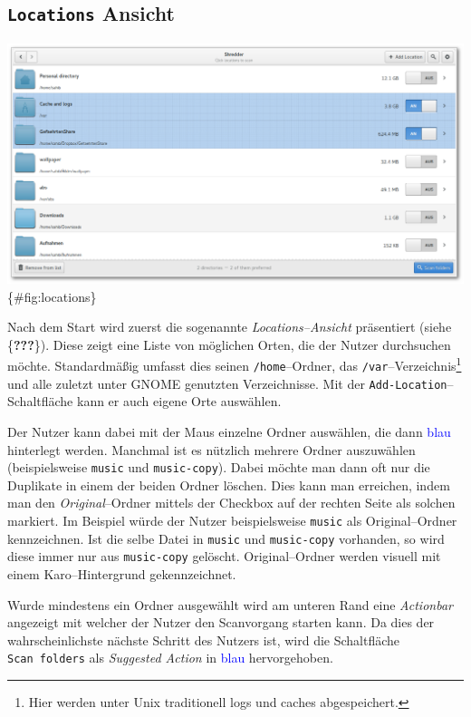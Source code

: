 \documentclass[11pt,ngerman,toc=listof,index=totoc]{scrreprt}
\begin{document}
\subsection{\texorpdfstring{\texttt{Locations}
Ansicht}{Locations Ansicht}}\label{locations-ansicht}

\includegraphics{docs/pics/gui_locations.png} \{\#fig:locations\}

Nach dem Start wird zuerst die sogenannte \emph{Locations--Ansicht}
präsentiert (siehe \{\textbf{???}\}). Diese zeigt eine Liste von
möglichen Orten, die der Nutzer durchsuchen möchte. Standardmäßig
umfasst dies seinen \texttt{/home}--Ordner, das
\texttt{/var}--Verzeichnis\footnote{Hier werden unter Unix traditionell
  logs und caches abgespeichert.} und alle zuletzt unter GNOME genutzten
Verzeichnisse. Mit der \texttt{Add-Location}--Schaltfläche kann er auch
eigene Orte auswählen.

Der Nutzer kann dabei mit der Maus einzelne Ordner auswählen, die dann
\textcolor{blue}{blau} hinterlegt werden. Manchmal ist es nützlich
mehrere Ordner auszuwählen (beispielsweise \texttt{music} und
\texttt{music-copy}). Dabei möchte man dann oft nur die Duplikate in
einem der beiden Ordner löschen. Dies kann man erreichen, indem man den
\emph{Original}--Ordner mittels der Checkbox auf der rechten Seite als
solchen markiert. Im Beispiel würde der Nutzer beispielsweise
\texttt{music} als Original--Ordner kennzeichnen. Ist die selbe Datei in
\texttt{music} und \texttt{music-copy} vorhanden, so wird diese immer
nur aus \texttt{music-copy} gelöscht. Original--Ordner werden visuell
mit einem Karo--Hintergrund gekennzeichnet.

Wurde mindestens ein Ordner ausgewählt wird am unteren Rand eine
\emph{Actionbar} angezeigt mit welcher der Nutzer den Scanvorgang
starten kann. Da dies der wahrscheinlichste nächste Schritt des Nutzers
ist, wird die Schaltfläche \texttt{Scan\ folders} als \emph{Suggested
Action} in \textcolor{blue}{blau} hervorgehoben.
\end{document}
